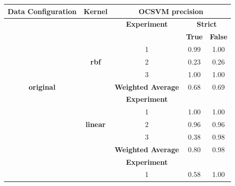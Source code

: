 \documentclass{mpaper}
\begin{document}
\begin{table}[]
\centering
\begin{tabular}{|c|c|ccc|}
\hline
\textbf{Data Configuration} & \textbf{Kernel} & \multicolumn{3}{c|}{\textbf{OCSVM precision}}                                         \\ \hline
\multicolumn{1}{|l|}{}      & \textbf{}       & \multicolumn{1}{c|}{\textbf{Experiment}}       & \multicolumn{2}{c|}{\textbf{Strict}} \\ \cline{3-5} 
                            &                 & \multicolumn{1}{l|}{}                          & \textbf{True}    & \textbf{False}    \\ \cline{3-5} 
                            &                 & \multicolumn{1}{c|}{1}                         & 0.99             & 1.00              \\
\multicolumn{1}{|l|}{}      & \textbf{rbf}    & \multicolumn{1}{c|}{2}                         & 0.23             & 0.26              \\
                            &                 & \multicolumn{1}{c|}{3}                         & 1.00             & 1.00              \\ \cline{3-5} 
\textbf{original}           &                 & \multicolumn{1}{c|}{\textbf{Weighted Average}} & 0.68             & 0.69              \\ \cline{2-5} 
                            &                 & \multicolumn{1}{c|}{\textbf{Experiment}}       & \textbf{}        & \textbf{}         \\ \cline{3-5} 
                            &                 & \multicolumn{1}{c|}{1}                         & 1.00             & 1.00              \\
                            & \textbf{linear} & \multicolumn{1}{c|}{2}                         & 0.96             & 0.96              \\
                            &                 & \multicolumn{1}{c|}{3}                         & 0.38             & 0.98              \\
                            \cline{3-5}
                            &                 & \multicolumn{1}{c|}{\textbf{Weighted Average}} & 0.80             & 0.98              \\ \hline
                            &                 & \multicolumn{1}{c|}{\textbf{Experiment}}       & \textbf{}        & \textbf{}         \\ \cline{3-5} 
                            &                 & \multicolumn{1}{c|}{1}                         & 0.58             & 1.00              \\

\end{tabular}
\end{table}
\end{document}
